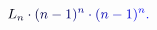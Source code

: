 \documentclass[12pt]{article}
\begin{document}
\makeatletter
\renewcommand*{\@textcolor}[3]{%
  \protect\leavevmode
  \begingroup
    \color#1{#2}#3%
  \endgroup
}
\makeatother
\begin{displaymath}
\mathcolor[RGB]{0,0,15}{L} _ { \mathcolor[RGB]{0,0,30}{n} } \mathcolor[RGB]{0,0,45}{\cdot} \mathcolor[RGB]{0,0,60}{(} \mathcolor[RGB]{0,0,75}{n} \mathcolor[RGB]{0,0,90}{-} \mathcolor[RGB]{0,0,105}{1} \mathcolor[RGB]{0,0,120}{)} ^ { \mathcolor[RGB]{0,0,135}{n} } \mathcolor[RGB]{0,0,150}{\cdot} \mathcolor[RGB]{0,0,165}{(} \mathcolor[RGB]{0,0,180}{n} \mathcolor[RGB]{0,0,195}{-} \mathcolor[RGB]{0,0,210}{1} \mathcolor[RGB]{0,0,225}{)} ^ { \mathcolor[RGB]{0,0,240}{n} } \mathcolor[RGB]{0,0,255}{.}
\end{displaymath}
\end{document}
